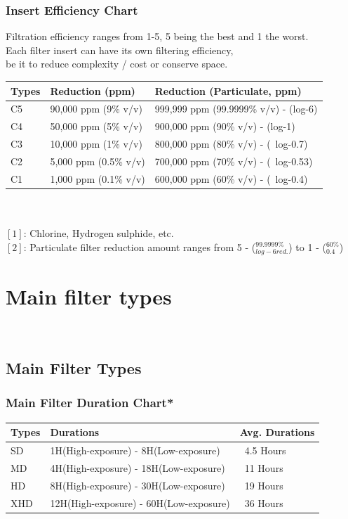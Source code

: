 \documentclass[a4paper, 12pt, oneside]{article}
\begin{document}
{		\subsubsection{Insert Efficiency Chart}
			Filtration efficiency ranges from 1-5, 5 being the best and 1 the worst. \\
			Each filter insert can have its own filtering efficiency, \\
			be it to reduce complexity / cost or conserve space.
			\begin{tabular}{|p{1cm}||p{4cm}|p{7.57cm}|}
				\hline
				Types & Reduction (ppm) & Reduction (Particulate, ppm) \\\hline
				C5 & 90,000 ppm (9\% v/v) & 999,999 ppm (99.9999\% v/v) - (log-6) \\
				C4 & 50,000 ppm (5\% v/v) & 900,000 ppm (90\% v/v) - (log-1) \\
				C3 & 10,000 ppm (1\% v/v) & 800,000 ppm (80\% v/v) - (~log-0.7) \\
				C2 & 5,000  ppm (0.5\% v/v) & 700,000 ppm (70\% v/v) - (~log-0.53) \\
				C1 & 1,000  ppm (0.1\% v/v) & 600,000 ppm (60\% v/v) - (~log-0.4) 	\\\hline
			\end{tabular} \\ \- \\
			$[1]$: Chlorine, Hydrogen sulphide, etc. \\
			$[2]$: Particulate filter reduction amount ranges from
			 5 - ($^{99.9999\%}_{log-6red.}$) to 1 - ($^{60\%}_{0.4}$)
			
	\newpage
			
	\section{Main filter types} \-\\
		\subsection{Main Filter Types}
			\subsubsection{Main Filter Duration Chart*}
				\begin{tabular}{|p{1cm}||p{8.44cm}|p{3cm}|}
					\hline
					Types & Durations & Avg. Durations \\\hline
					SD & 1H(High-exposure) - 8H(Low-exposure) &  ~4.5 Hours\\
					MD & 4H(High-exposure) - 18H(Low-exposure) & ~11 Hours \\
					HD & 8H(High-exposure) - 30H(Low-exposure) & ~19 Hours \\
					XHD & 12H(High-exposure) - 60H(Low-exposure) & ~36 Hours \\\hline
				\end{tabular} \\ \-\\
}
\end{document}
